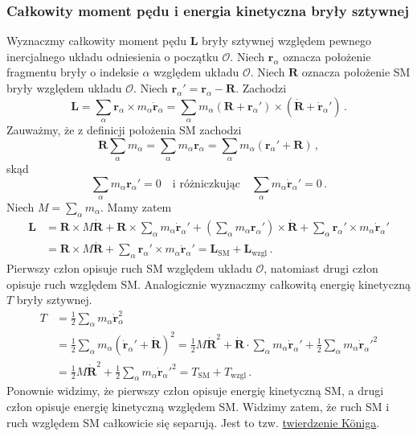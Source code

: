 \documentclass[../main.tex]{subfiles}
\begin{document}
\subsubsection{Całkowity moment pędu i energia kinetyczna bryły sztywnej}
Wyznaczmy całkowity moment pędu \(\mathbf{L}\) bryły sztywnej względem pewnego inercjalnego układu odniesienia o początku \(\mathcal{O}\). Niech \(\mathbf{r}_\alpha\) oznacza położenie fragmentu bryły o indeksie \(\alpha\) względem układu \(\mathcal{O}\). Niech \(\mathbf{R}\) oznacza położenie SM bryły względem układu \(\mathcal{O}\). Niech \(\mathbf{r}_\alpha'=\mathbf{r}_\alpha-\mathbf{R}\). Zachodzi
\begin{equation*}
    \mathbf{L}=\sum_{\alpha}\mathbf{r}_\alpha\times m_\alpha\dot{\mathbf{r}}_\alpha=\sum_\alpha m_\alpha (\mathbf{R}+\mathbf{r}_\alpha')\times (\dot{\mathbf{R}}+\dot{\mathbf{r}}_\alpha')\,.
\end{equation*}
Zauważmy, że z definicji położenia SM zachodzi
\begin{equation*}
    \mathbf{R}\sum_\alpha m_\alpha=\sum_\alpha m_\alpha\mathbf{r}_\alpha=\sum_\alpha m_\alpha (\mathbf{r}_\alpha'+\mathbf{R})\,,
\end{equation*}
skąd
\begin{equation*}
    \sum_\alpha m_\alpha\mathbf{r}_\alpha'=0\quad\text{i różniczkując}\quad \sum_\alpha m_\alpha\dot{\mathbf{r}}_\alpha'=0\,.
\end{equation*}
Niech \(M=\sum_\alpha m_\alpha\). Mamy zatem
\begin{equation*}
\begin{split}
     \mathbf{L}&=\mathbf{R}\times M\dot{\mathbf{R}}+\mathbf{R}\times\sum_\alpha m_\alpha\dot{\mathbf{r}}_\alpha'+\left(\sum_\alpha m_\alpha\mathbf{r}_\alpha'\right)\times\dot{\mathbf{R}}+\sum_\alpha \mathbf{r}_\alpha'\times m_\alpha \dot{\mathbf{r}}_\alpha'\\
     &=\mathbf{R}\times M\dot{\mathbf{R}}+\sum_\alpha \mathbf{r}_\alpha'\times m_\alpha \dot{\mathbf{r}}_\alpha'=\mathbf{L}_\text{SM}+\mathbf{L}_\text{wzgl}\,.
\end{split}
\end{equation*}
Pierwszy człon opisuje ruch SM względem układu \(\mathcal{O}\), natomiast drugi człon opisuje ruch względem SM. Analogicznie wyznaczmy całkowitą energię kinetyczną \(T\) bryły sztywnej.
\begin{equation*}
\begin{split}
    T&=\frac{1}{2}\sum_\alpha m_\alpha \dot{\mathbf{r}}_\alpha^2\\
    &=\frac{1}{2}\sum_\alpha m_\alpha \left(\dot{\mathbf{r}}_\alpha'+\dot{\mathbf{R}}\right)^2=\frac{1}{2}M\dot{\mathbf{R}}^2+\dot{\mathbf{R}}\cdot\sum_\alpha m_\alpha \dot{\mathbf{r}}_\alpha'+\frac{1}{2}\sum_\alpha m_\alpha \dot{\mathbf{r}}_\alpha'^2\\
    &=\frac{1}{2}M\dot{\mathbf{R}}^2+\frac{1}{2}\sum_\alpha m_\alpha \dot{\mathbf{r}}_\alpha'^2=T_\text{SM}+T_\text{wzgl}\,.
\end{split}
\end{equation*}
Ponownie widzimy, że pierwszy człon opisuje energię kinetyczną SM, a drugi człon opisuje energię kinetyczną względem SM. Widzimy zatem, że ruch SM i ruch względem SM całkowicie się separują. Jest to tzw. \underline{twierdzenie Königa}.
\end{document}
